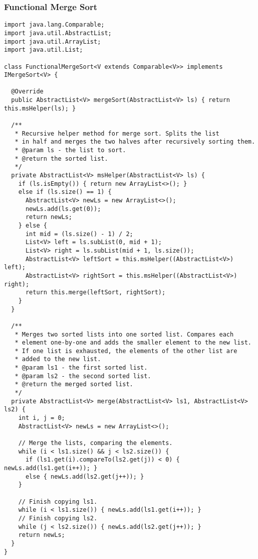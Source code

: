 \subsubsection*{Functional Merge Sort}
\begin{lstlisting}[language=MyJava]
import java.lang.Comparable;
import java.util.AbstractList;
import java.util.ArrayList;
import java.util.List;
  
class FunctionalMergeSort<V extends Comparable<V>> implements IMergeSort<V> {
  
  @Override
  public AbstractList<V> mergeSort(AbstractList<V> ls) { return this.msHelper(ls); }
  
  /**
   * Recursive helper method for merge sort. Splits the list 
   * in half and merges the two halves after recursively sorting them.
   * @param ls - the list to sort.
   * @return the sorted list.
   */
  private AbstractList<V> msHelper(AbstractList<V> ls) {
    if (ls.isEmpty()) { return new ArrayList<>(); } 
    else if (ls.size() == 1) {
      AbstractList<V> newLs = new ArrayList<>();
      newLs.add(ls.get(0));
      return newLs;
    } else {
      int mid = (ls.size() - 1) / 2;
      List<V> left = ls.subList(0, mid + 1);
      List<V> right = ls.subList(mid + 1, ls.size());
      AbstractList<V> leftSort = this.msHelper((AbstractList<V>) left);
      AbstractList<V> rightSort = this.msHelper((AbstractList<V>) right);
      return this.merge(leftSort, rightSort);
    }
  }
  
  /**
   * Merges two sorted lists into one sorted list. Compares each 
   * element one-by-one and adds the smaller element to the new list. 
   * If one list is exhausted, the elements of the other list are
   * added to the new list.
   * @param ls1 - the first sorted list.
   * @param ls2 - the second sorted list.
   * @return the merged sorted list.
   */
  private AbstractList<V> merge(AbstractList<V> ls1, AbstractList<V> ls2) {
    int i, j = 0;
    AbstractList<V> newLs = new ArrayList<>();
          
    // Merge the lists, comparing the elements.
    while (i < ls1.size() && j < ls2.size()) {
      if (ls1.get(i).compareTo(ls2.get(j)) < 0) { newLs.add(ls1.get(i++)); } 
      else { newLs.add(ls2.get(j++)); }
    }
  
    // Finish copying ls1.
    while (i < ls1.size()) { newLs.add(ls1.get(i++)); }
    // Finish copying ls2.
    while (j < ls2.size()) { newLs.add(ls2.get(j++)); }
    return newLs;
  }
}
\end{lstlisting}

